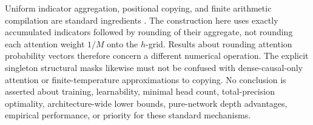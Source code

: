 Uniform indicator aggregation, positional copying, and finite arithmetic
compilation are standard ingredients
\citep{WeissGoldbergYahav2021,MerrillSabharwal2023,EdelmanEtAl2024,
RajaramanEtAl2024}. The construction here uses exactly accumulated
indicators followed by rounding of their aggregate, not rounding each
attention weight $1/M$ onto the $h$-grid. Results about rounding attention
probability vectors therefore concern a different numerical operation.
The explicit singleton structural masks likewise must not be confused
with dense-causal-only attention or finite-temperature approximations to
copying. No conclusion is asserted about training, learnability, minimal
head count, total-precision optimality, architecture-wide lower bounds,
pure-network depth advantages, empirical performance, or priority for
these standard mechanisms.
